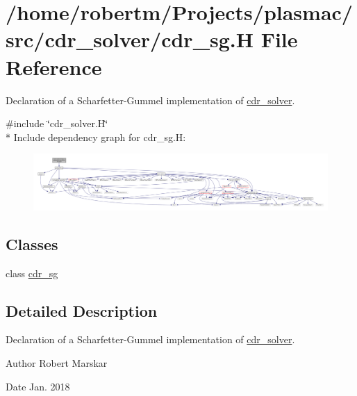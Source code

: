 \hypertarget{cdr__sg_8H}{}\section{/home/robertm/\+Projects/plasmac/src/cdr\+\_\+solver/cdr\+\_\+sg.H File Reference}
\label{cdr__sg_8H}


Declaration of a Scharfetter-\/\+Gummel implementation of \hyperlink{classcdr__solver}{cdr\+\_\+solver}.  


{\ttfamily \#include \char`\"{}cdr\+\_\+solver.\+H\char`\"{}}\\*
Include dependency graph for cdr\+\_\+sg.\+H\+:\nopagebreak
\begin{figure}[H]
\begin{center}
\leavevmode
\includegraphics[width=350pt]{cdr__sg_8H__incl}
\end{center}
\end{figure}
\subsection*{Classes}
\begin{DoxyCompactItemize}
\item 
class \hyperlink{classcdr__sg}{cdr\+\_\+sg}
\end{DoxyCompactItemize}


\subsection{Detailed Description}
Declaration of a Scharfetter-\/\+Gummel implementation of \hyperlink{classcdr__solver}{cdr\+\_\+solver}. 

\begin{DoxyAuthor}{Author}
Robert Marskar 
\end{DoxyAuthor}
\begin{DoxyDate}{Date}
Jan. 2018 
\end{DoxyDate}
